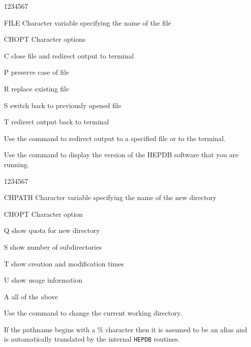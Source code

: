 \begin{DLtt}{1234567}
\item[FILE]Character variable specifying the name of the file
\item[CHOPT]Character options
  \begin{DLtt}{1}
    \item[C]close file and redirect output to terminal
    \item[P]preserve case of file
    \item[R]replace existing file
    \item[S]switch back to previously opened file
    \item[T]redirect output back to terminal
  \end{DLtt}
\end{DLtt}

Use the  command to redirect output to a specified file
or to the terminal.


Use the  command to display the version of the HEPDB
software that you are running.


\begin{DLtt}{1234567}
\item[CHPATH]Character variable specifying the name of the new directory
\item[CHOPT]Character option
  \begin{DLtt}{1}
    \item[Q]show quota for new directory
    \item[S]show number of subdirectories
    \item[T]show creation and modification times
    \item[U]show usage information
    \item[A]all of the above
  \end{DLtt}
\end{DLtt}

Use the  command to change the current working directory.

If the pathname begins with a \% character then it is assumed to be
an alias and is automatically translated by the internal {\tt HEPDB}
routines.


